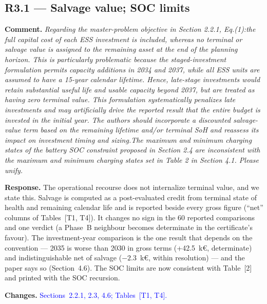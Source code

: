 \documentclass[11pt]{article}
\newcommand{\rcomment}[1]{\par\medskip\noindent\textbf{Comment.} \textit{#1}\par\smallskip}
\newcommand{\rresponse}[1]{\noindent\textbf{Response.} #1\par\smallskip}
\newcommand{\rchanges}[1]{\noindent\textbf{Changes.} \textcolor{blue}{#1}\par\medskip}
\begin{document}
\subsection*{R3.1 --- Salvage value; SOC limits}
\rcomment{
Regarding the master-problem objective in Section 2.2.1, Eq.(1):the full capital cost of each ESS investment is included, whereas no terminal or salvage value is assigned to the remaining asset at the end of the planning horizon. This is particularly problematic because the staged-investment formulation permits capacity additions in 2034 and 2037, while all ESS units are assumed to have a 15-year calendar lifetime. Hence, late-stage investments would retain substantial useful life and usable capacity beyond 2037, but are treated as having zero terminal value. This formulation systematically penalizes late investments and may artificially drive the reported result that the entire budget is invested in the initial year. The authors should incorporate a discounted salvage-value term based on the remaining lifetime and/or terminal SoH and reassess its impact on investment timing and sizing.The maximum and minimum charging states of the battery SOC constraint proposed in Section 2.4 are inconsistent with the maximum and minimum charging states set in Table 2 in Section 4.1. Please unify.
}
\rresponse{The operational recourse does not internalize terminal value, and we state this. Salvage is
computed as a post-evaluated credit from terminal state of health and remaining calendar life and is
reported beside every gross figure (``net'' columns of Tables~[T1, T4]). It changes no sign in the 60
reported comparisons and one verdict (a Phase~B neighbour becomes determinate in the certificate's
favour). The investment-year comparison is the one result that depends on the convention --- 2035 is
worse than 2030 in gross terms (+42.5~k\euro{}, determinate) and indistinguishable net of salvage
($-2.3$~k\euro{}, within resolution) --- and the paper says so (Section~4.6). The SOC limits are now
consistent with Table~[2] and printed with the SOC recursion.}
\rchanges{Sections~2.2.1, 2.3, 4.6; Tables~[T1, T4].}
\end{document}
